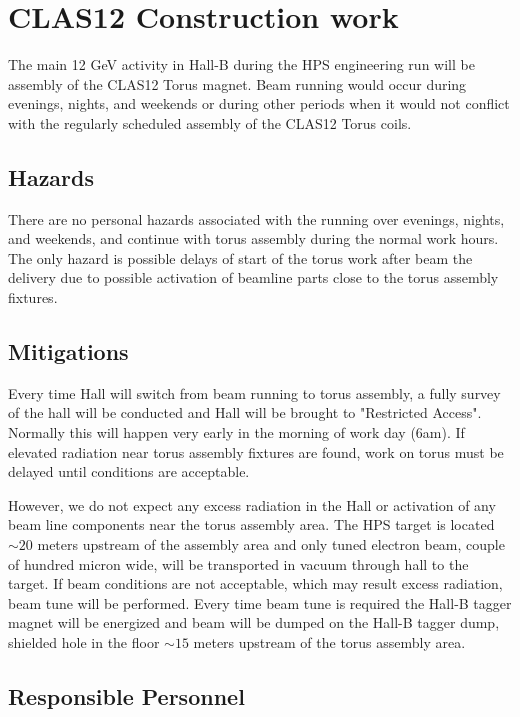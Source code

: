\section{CLAS12 Construction work}
\indent

The main 12 GeV activity in Hall-B during the HPS engineering run will be assembly of the CLAS12 Torus magnet. Beam running would occur during evenings, nights, and weekends or during other periods when it would not conflict with the regularly scheduled assembly of the CLAS12 Torus coils.

\subsection{Hazards} 
\indent

There are no personal hazards associated with the running over evenings, nights, and weekends, and continue with torus assembly during the normal work hours. The only hazard is possible delays of start of the torus work after beam the delivery due to possible activation of beamline parts close to the torus assembly fixtures.
 
\subsection{Mitigations}
\indent

Every time Hall will switch from beam running to torus assembly, a fully survey of the hall will be conducted and Hall will be brought to "Restricted Access". Normally this will happen very early in the morning of work day (6am). If elevated radiation near torus assembly fixtures are found, work on torus must be delayed until conditions are acceptable. 

However, we do not expect any excess radiation in the Hall or activation of any beam line components near the torus assembly area. The HPS  target is located $\sim20$ meters upstream of the assembly area and only tuned electron beam, couple of hundred micron wide, will be transported in vacuum through hall to the target. If beam conditions are not acceptable, which may result excess radiation, beam tune will be performed. Every time beam tune is required the Hall-B tagger magnet will be energized and beam will be dumped on the Hall-B tagger dump, shielded hole in the floor $\sim 15$ meters upstream of the torus assembly area. 

\subsection{Responsible Personnel}
\indent

